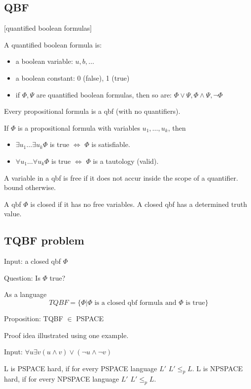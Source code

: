 \documentclass[a4paper,12pt]{article}
\theoremstyle{definition}
\theoremstyle{remark}
\begin{document}
\subsection{QBF}[quantified boolean formulas]

A quantified boolean formula is:
\begin{itemize}
    \item a boolean variable: $u, b, \dots$
    \item a boolean constant: 0 (false), 1 (true)
    \item if $\Phi, \Psi$ are quantified boolean formulas, then so are: $\Phi \lor \Psi, \Phi \land \Psi, \neg \Phi$
\end{itemize}

Every propositional formula is a qbf (with no quantifiers).

If $\Phi$ is a propositional formula with variables $u_1, \dots, u_k$, then 
\begin{itemize}
    \item $\exists u_1 \dots \exists u_k \Phi$ is true $\iff$ $\Phi$ is satisfiable.
    \item $\forall u_1 \dots \forall u_k \Phi$ is true $\iff$ $\Phi$ is a tautology (valid).
\end{itemize}

A variable in a qbf is free if it does not accur inside the scope of a quantifier.
bound otherwise.

A qbf $\Phi$ is closed if it has no free variables.
A closed qbf has a determined truth value.

\subsection{TQBF problem}
Input: a closed qbf $\Phi$

Question: Is $\Phi$ true?

As a language
\begin{equation*}
    TQBF = \{\Phi | \Phi \text{ is a closed qbf formula and } \Phi \text{ is true}\}
\end{equation*}

Proposition: TQBF $\in$ PSPACE

Proof idea illustrated using one example.

Input: $\forall u \exists v (u \land v) \lor (\neg u \land \neg v)$

L is PSPACE hard, if for every PSPACE language $L'$ $L' \leq_p L$.
L is NPSPACE hard, if for every NPSPACE language $L'$ $L' \leq_p L$.
\end{document}
